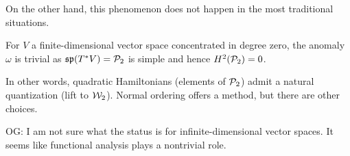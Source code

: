 \documentclass[11pt]{amsart}
\def\owen#1{{\textcolor{violet!65!black}{OG: {#1}}}}
\begin{document}
On the other hand, this phenomenon does not happen in the most traditional situations.

\begin{cor}
\label{cor:trivforsp}
For $V$ a finite-dimensional vector space concentrated in degree zero, the anomaly $\omega$ is trivial as $\frak{sp}(T^* V) = \mathcal P_2$ is simple and hence $H^2(\mathcal P_2) = 0$.
\end{cor}

In other words, quadratic Hamiltonians (elements of $\mathcal P_2$) admit a natural quantization (lift to $\mathcal W_2$).
Normal ordering offers a method, but there are other choices.

\owen{I am not sure what the status is for infinite-dimensional vector spaces. It seems like functional analysis plays a nontrivial role.}
\end{document}
